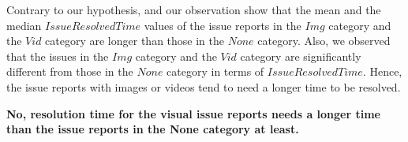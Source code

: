 Contrary to our hypothesis,  and our observation show that 
the mean and the median $IssueResolvedTime$ values of 
the issue reports in the $Img$ category and the $Vid$ category are 
longer than those in the $None$ category. 
Also, we observed that the issues in the $Img$ category and 
the $Vid$ category are significantly different from those 
in the $None$ category in terms of $IssueResolvedTime$.
Hence, the issue reports with images or videos tend to need 
a longer time to be resolved. 




\summarybox
{\bf No, resolution time for the visual issue reports needs a longer time than the issue reports in the None category at least.
}

